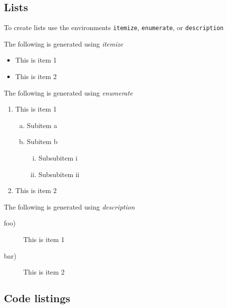 \documentclass{UoNMCHA}
\numberwithin{equation}{section}
\begin{document}
\newpage
\subsection{Lists}
To create lists use the environments \verb|itemize|, \verb|enumerate|, or \verb|description|

The following is generated using \emph{itemize}
\begin{itemize}
    \item This is item 1 
    \item This is item 2
\end{itemize}
%
The following is generated using \emph{enumerate}
\begin{enumerate}[1)]
    \item This is item 1 
    \begin{enumerate}[a)]
        \item Subitem a
        \item Subitem b
        \begin{enumerate}[i)]
            \item Subsubitem i
            \item Subsubitem ii
        \end{enumerate}
    \end{enumerate}
    \item This is item 2
\end{enumerate}
%
The following is generated using \emph{description}
\begin{description}
    \item[foo)] This is item 1 
    \item[bar)] This is item 2
\end{description}

\subsection{Code listings}
\end{document}
